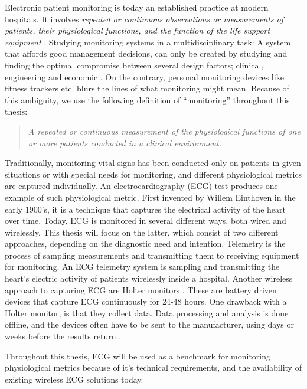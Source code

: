 Electronic patient monitoring is today an established practice at modern hospitals. It involves \textit{repeated or continuous observations or measurements of patients, their physiological functions, and the function of the life support equipment} \cite{PMID:10315668}. Studying monitoring systems in a multidisciplinary task: A system that affords good management decisions, can only be created by studying and finding the optimal compromise between several design factors; clinical, engineering and economic \cite{Anonymous:yOjY0N0Y}. On the contrary, personal monitoring devices like fitness trackers etc. blurs the lines of what monitoring might mean. Because of this ambiguity, we use the following definition of ``monitoring'' throughout this thesis:

\begin{quote} 
\textit{A repeated or continuous measurement of the physiological functions of one or more patients conducted in a clinical environment.}
\end{quote}

Traditionally, monitoring vital signs has been conducted only on patients in given situations or with special needs for monitoring, and different physiological metrics are captured individually. An electrocardiography (ECG) test produces one example of such physiological metric. First invented by Willem Einthoven in the early 1900's, it is a technique that captures the electrical activity of the heart over time. Today, ECG is monitored in several different ways, both wired and wirelessly. This thesis will focus on the latter, which consist of two different approaches, depending on the diagnostic need and intention. Telemetry is the process of sampling measurements and transmitting them to receiving equipment for monitoring. An ECG telemetry system is sampling and transmitting the heart's electric activity of patients wirelessly inside a hospital. Another wireless approach to capturing ECG are Holter monitors \cite{holter_13}. These are battery driven devices that capture ECG continuously for 24-48 hours. One drawback with a Holter monitor, is that they collect data. Data processing and analysis is done offline, and the devices often have to be sent to the manufacturer, using days or weeks before the results return \cite{ziopatch_14}.

Throughout this thesis, ECG will be used as a benchmark for monitoring physiological metrics because of it's technical requirements, and the availability of existing wireless ECG solutions today.

